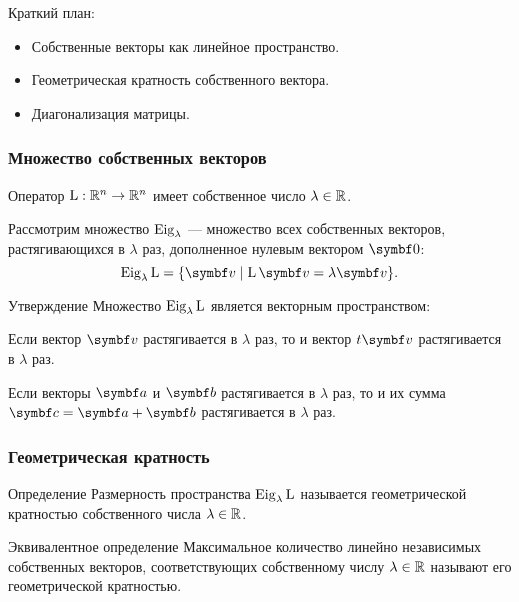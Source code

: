 
\begin{frame} %


\end{frame}



\begin{frame}{Краткий план:}
  \begin{itemize}[<+->]
    \item Собственные векторы как линейное пространство. 
    \item Геометрическая кратность собственного вектора.
    \item Диагонализация матрицы.
  \end{itemize}

\end{frame}


\begin{frame}
    \frametitle{Множество собственных векторов}

    Оператор $\operatorname{L} :\mathbb{R}^n \to \mathbb{R}^n$ имеет собственное число $\lambda \in \mathbb{R}$.
    
    Рассмотрим множество $\operatorname{Eig}_\lambda$ — множество всех собственных векторов, растягивающихся 
    в $\lambda$ раз, дополненное нулевым вектором $\bzero$:
    \[
        \eig_\lambda \LL = \{ \bv \mid \LL \bv = \lambda \bv \}.
    \]

    \pause

    \begin{block}{Утверждение}
        Множество $\operatorname{Eig}_{\lambda} \operatorname{L}$ является векторным пространством:
        \pause

        Если вектор $\bv$ растягивается в $\lambda$ раз, то и вектор $t \bv$ растягивается в $\lambda$ раз.
        \pause

       Если векторы $\ba$ и $\bb$ растягивается в $\lambda$ раз, 
       то и их сумма $\bc = \ba + \bb$ растягивается в $\lambda$ раз.
    \end{block}

    

\end{frame}


\begin{frame}
    \frametitle{Геометрическая кратность}

    \begin{block}{Определение}
        Размерность пространства $\operatorname{Eig}_\lambda \operatorname{L}$ называется
        \alert{геометрической кратностью} собственного числа $\lambda \in \mathbb{R}$.        
    \end{block}

    \pause
    \begin{block}{Эквивалентное определение}
        Максимальное количество линейно независимых собственных векторов,
        соответствующих собственному числу $\lambda  \in \mathbb{R}$ называют его 
        \alert{геометрической кратностью}.        
    \end{block}

\end{frame}


